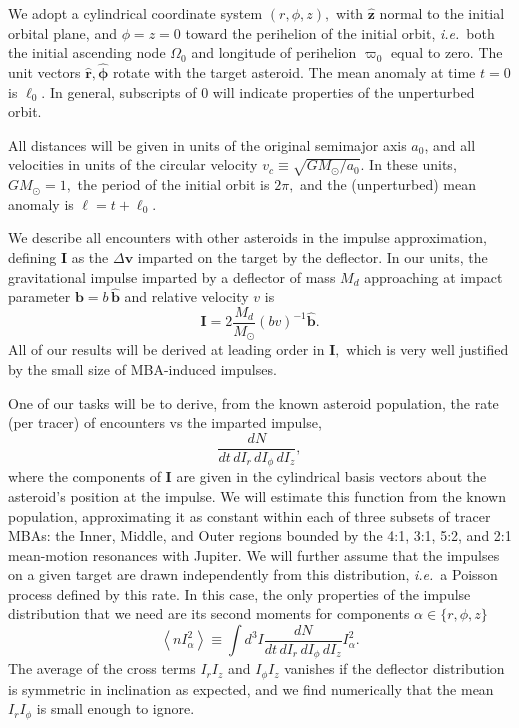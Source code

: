 \documentclass[linenumbers, onecolumn]{aastex631}
\newcommand{\ie}{\textit{i.e.\/}}
\newcommand{\vecI}{\mathbf{I}}
\newcommand{\vecb}{\mathbf{b}}
\newcommand{\bhat}{\mathbf{\hat b}}
\newcommand{\rhat}{\mathbf{\hat r}}
\newcommand{\phat}{\boldsymbol{\hat\phi}}
\newcommand{\zhat}{\mathbf{\hat z}}
\newcommand{\vecv}{\mathbf{v}}
\newcommand{\vcirc}{v_c}
\newcommand{\Msun}{M_\odot}
\newcommand{\lop}{\varpi}   %
\newcommand{\ma}{\ell}  %
\begin{document}
We adopt a cylindrical coordinate system $(r,\phi,z),$ with $\zhat$
normal to the initial orbital plane, and $\phi=z=0$ toward the
perihelion of the initial orbit, \ie\ both the initial ascending node
$\Omega_0$ and longitude of perihelion $\lop_0$ equal to zero.  The
unit vectors $\rhat, \phat$ rotate with the target asteroid.  The mean
anomaly at time $t=0$ is $\ma_0.$  In general, subscripts of $0$ will
indicate properties of the unperturbed orbit.

All distances will be given in units of the original semimajor axis $a_0$, and all velocities in units of the circular velocity $\vcirc \equiv \sqrt{G\Msun/a_0}.$  In these units, $G\Msun=1,$ the period of the initial orbit is $2\pi,$ and the (unperturbed) mean anomaly is $\ma=t+\ma_0.$ 

We describe all encounters with other asteroids in the impulse approximation, defining $\vecI$ as the $\Delta\vecv$ imparted on the target by the deflector.
In our units, the gravitational impulse imparted by a deflector of mass $M_d$ approaching at impact parameter $\vecb=b\,\bhat$ and relative velocity $v$ is
\begin{equation}
  \vecI = 2 \frac{M_d}{\Msun} (bv)^{-1} \bhat.
  \label{eq:impulse}
\end{equation}
All of our results will be derived at leading order in $\vecI,$ which
is very well justified by the small size of MBA-induced impulses.

One of our tasks will be to derive, from the known asteroid population, the rate (per tracer) of encounters vs the imparted impulse,
\begin{equation}
  \frac{dN}{dt\,dI_r\,dI_\phi\,dI_z},
  \label{eq:dN}
\end{equation}
where the components of $\vecI$ are given in the cylindrical basis
vectors about the asteroid's position at the impulse.
We will estimate this function from the known population,
approximating it as constant within each of three subsets of tracer MBAs:
the Inner, Middle, and Outer regions bounded by the 4:1, 3:1,
5:2, and 2:1 mean-motion resonances with Jupiter.
We will further assume that the impulses on a given target are drawn
independently from this distribution, \ie\ a Poisson process defined
by this rate.  In this case, the only properties of the impulse
distribution that we need are its second moments for components $\alpha \in \{r,\phi,z\}$
\begin{equation}
  \left \langle n I_\alpha^2 \right\rangle \equiv \int d^3I \frac{dN}{dt\,dI_r\,dI_\phi\,dI_z} I_\alpha^2.
\label{eq:nvsq}
\end{equation}
The average of the cross terms $I_rI_z$ and $I_\phi I_z$ vanishes if
the deflector distribution is symmetric in inclination as expected, and we find numerically that the mean $I_rI_\phi$ is small enough to ignore.
\end{document}
